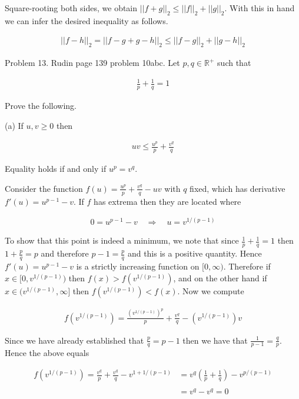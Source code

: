 \documentclass{article}
\begin{document}
  Square-rooting both sides, we obtain $||f+g||_2\leq ||f||_2+||g||_2$.  With this in hand we can infer the desired inequality as follows.

  \begin{align*}
    ||f-h||_2=||f-g+g-h||_2\leq ||f-g||_2+||g-h||_2
  \end{align*}

  \pagebreak
  {\Large \color{Sepia} Problem 13. Rudin page 139 problem 10abc. Let $p,q\in \mathbb R^+$ such that

  \begin{align*}
    \frac 1 p + \frac 1 q = 1
  \end{align*}

  Prove the following.

  (a) If $u,v\geq 0$ then

  \begin{align*}
    uv\leq \frac{u^p}{p} + \frac{v^q}{q}
  \end{align*}

  Equality holds if and only if $u^p=v^q$.

  }

  \vspace{1cm}

  Consider the function $f(u)=\frac{u^p}{p}+\frac{v^q}{q}-uv$ with $q$ fixed, which has derivative $f'(u)=u^{p-1}-v$.  If $f$ has extrema then they are located where

  \begin{align*}
    0=u^{p-1}-v \quad \Rightarrow \quad u = v^{1/(p-1)}
  \end{align*}

  To show that this point is indeed a minimum, we note that since $\frac 1 p + \frac 1 q = 1$ then $1 +\frac p q = p$ and therefore $p-1=\frac p q$ and this is a positive quantity.  Hence $f'(u)=u^{p-1}-v$ is a strictly increasing function on $[0,\infty)$.  Therefore if $x\in[0,v^{1/(p-1)})$ then $f(x)>f(v^{1/(p-1)})$, and on the other hand if $x\in (v^{1/(p-1)},\infty]$ then $f(v^{1/(p-1)})<f(x)$.  Now we compute

  \begin{align*}
    f(v^{1/(p-1)}) = \frac{(v^{1/(p-1)})^p}{p}+\frac{v^q}{q}-(v^{1/(p-1)})v
  \end{align*}

  Since we have already established that $\frac p q=p-1$ then we have that $\frac{1}{p-1}=\frac q p$.  Hence the above equals

  \begin{align*}
    f(v^{1/(p-1)})=\frac{v^q}{p}+\frac{v^q}{q} - v^{1+1/(p-1)} &= v^q \left(\frac 1 p +\frac 1 q\right) - v^{p/(p-1)}\\\\
    &= v^q -v^q = 0
  \end{align*}
\end{document}
